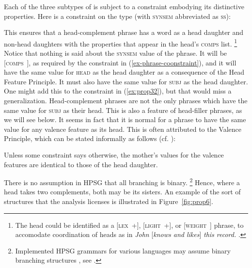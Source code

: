 \documentclass[output=paper
	        ,collection
	        ,collectionchapter
 	        ,biblatex
                ,babelshorthands
                ,newtxmath
                ,draftmode
                ,colorlinks, citecolor=brown
]{langscibook}
\begin{document}
\ea\label{ex:prop31}\label{page-hfp}
 \impl
{}
\z

Each of the three subtypes of  is subject to a constraint embodying its distinctive properties. Here is a constraint on the type  (with \textsc{synsem} abbreviated as \textsc{ss}):

\ea\label{ex:prop32}
 \impl
{}
\z

This ensures that a head-complement phrase has a word as a head daughter and non-head daughters with the  properties that appear in the head’s \textsc{comps} list.%
%
\footnote{The head could be identified as a [\textsc{lex}~+], [\textsc{light}~+], or [\textsc{weight}~] phrase, to accomodate coordination of heads as in \emph{John} [\emph{knows and likes}] \emph{this record.} \citep[Section~5.1]{Abeille2006a}.}
%
Notice that nothing is said about the \textsc{synsem} value of the phrase. It will be [\textsc{comps}~\eliste], as required by the constraint in (\ref{ex-phrase-coonstraint}), and it will have the same value for \textsc{head} as the head daughter as a consequence of the Head Feature Principle. It must also have the same value for \textsc{subj} as the head daughter. One might add this to the constraint in (\ref{ex:prop32}), but that would miss a generalization. Head-complement phrases are not the only phrases which have the same value for \textsc{subj} as their head. This is also a feature of head-filler phrases, as we will see below. It seems in fact that it is normal for a phrase to have the same value for any valence feature as its head. This is often attributed to the Valence Principle, which can be stated informally as follows (cf. \citealp[]{SagW99a-u}):

\ea\label{ex:prop33}
\label{prop:valence-principle}
Unless some constraint says otherwise, the mother's values for the valence features are identical to those of the head daughter.
\z

There is no assumption in HPSG that all branching is binary.%
%
\footnote{Implemented HPSG grammars for various languages
 may assume binary branching structures \citep{Flickinger2000a,Copestake2002a,MuellerCoreGram}, see .}
%
Hence, where a head takes two complements, both may be its sisters. An example of the sort of structures that the analysis licenses is illustrated in Figure~\ref{fig:prop6}.
\end{document}
